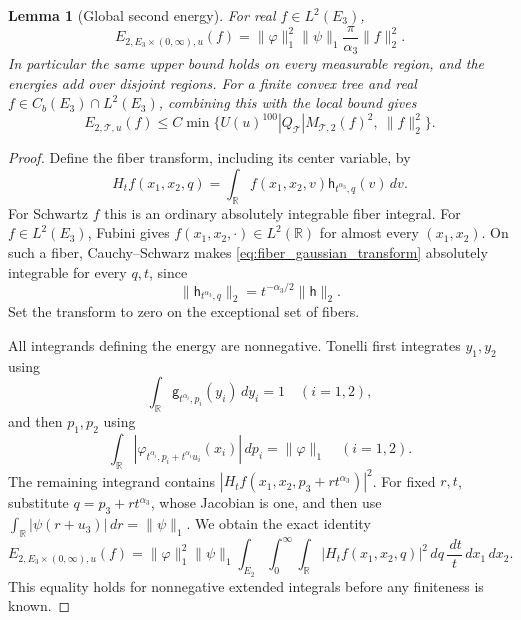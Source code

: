 \documentclass[12pt,reqno]{amsart}
\theoremstyle{plain}
\newtheorem{lemma}[theorem]{Lemma}
\theoremstyle{definition}
\theoremstyle{remark}
\numberwithin{equation}{section}
\newcommand{\R}{\mathbb R}
\newcommand{\T}{\mathcal T}
\newcommand{\g}{\mathsf g}
\newcommand{\h}{\mathsf h}
\newcommand{\dd}{\,d}
\begin{document}
\begin{lemma}[Global second energy]\label{lem:global_energy}
For real $f\in L^2(E_3)$,
\begin{equation}\label{eq:global_energy}
 E_{2,E_3\times(0,\infty),u}(f)
 =\|\varphi\|_1^2\|\psi\|_1\frac{\pi}{\alpha_3}\|f\|_2^2.
\end{equation}
In particular the same upper bound holds on every measurable region,
and the energies add over disjoint regions.
For a finite convex tree and real $f\in C_b(E_3)\cap L^2(E_3)$,
combining this with the local bound gives
\begin{equation}\label{eq:second_energy_minimum}
 E_{2,\T,u}(f)\le C\min\big\{
        U(u)^{100}|Q_\T|M_{\T,2}(f)^2,\ \|f\|_2^2\big\}.
\end{equation}
\end{lemma}
\begin{proof}
Define the fiber transform, including its center variable, by
\begin{equation}\label{eq:fiber_gaussian_transform}
 H_t f(x_1,x_2,q)=\int_\R f(x_1,x_2,v)
                              \h_{t^{\alpha_3},q}(v)\dd v.
\end{equation}
For Schwartz $f$ this is an ordinary absolutely integrable fiber
integral. For $f\in L^2(E_3)$, Fubini gives
$f(x_1,x_2,\cdot)\in L^2(\R)$ for almost every $(x_1,x_2)$.
On such a fiber, Cauchy--Schwarz makes \eqref{eq:fiber_gaussian_transform}
absolutely integrable for every $q,t$, since
\[
 \|\h_{t^{\alpha_3},q}\|_2=t^{-\alpha_3/2}\|\h\|_2.
\]
Set the transform to zero on the exceptional set of fibers.

All integrands defining the energy are nonnegative. Tonelli first
integrates $y_1,y_2$ using
\[
 \int_\R\g_{t^{\alpha_i},p_i}(y_i)\dd y_i=1\quad(i=1,2),
\]
and then $p_1,p_2$ using
\[
 \int_\R|\varphi_{t^{\alpha_i},p_i+t^{\alpha_i}u_i}(x_i)|\dd p_i
                        =\|\varphi\|_1\quad(i=1,2).
\]
The remaining integrand contains
$|H_t f(x_1,x_2,p_3+rt^{\alpha_3})|^2$. For fixed $r,t$, substitute
$q=p_3+rt^{\alpha_3}$, whose Jacobian is one, and then use
$\int_\R|\psi(r+u_3)|\dd r=\|\psi\|_1$. We obtain the exact identity
\begin{equation}\label{eq:global_energy_fiber_reduction}
 E_{2,E_3\times(0,\infty),u}(f)
  =\|\varphi\|_1^2\|\psi\|_1
    \int_{E_2}\int_0^\infty\int_\R
       |H_t f(x_1,x_2,q)|^2\dd q\,\frac{\dd t}{t}\dd x_1\dd x_2.
\end{equation}
This equality holds for nonnegative extended integrals before any
finiteness is known.


\end{proof}
\end{document}
